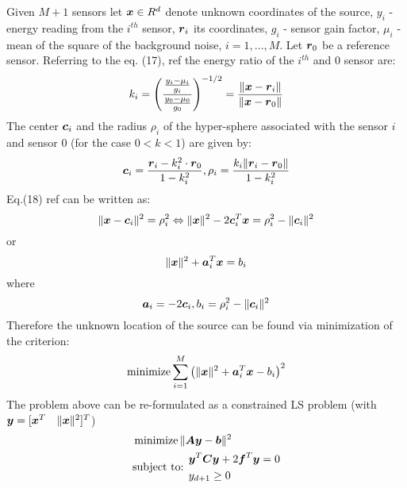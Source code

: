 \documentclass{amsart}
\theoremstyle{definition}
\theoremstyle{remark}
\numberwithin{equation}{section}
\newcommand{\Ba}{\mbox{\boldmath$a$}}
\newcommand{\Bb}{\mbox{\boldmath$b$}}
\newcommand{\Bc}{\mbox{\boldmath$c$}}
\newcommand{\Bf}{\mbox{\boldmath$f$}}
\newcommand{\Br}{\mbox{\boldmath$r$}}
\newcommand{\Bx}{\mbox{\boldmath$x$}}
\newcommand{\By}{\mbox{\boldmath$y$}}
\newcommand{\BA}{\mbox{\boldmath$A$}}
\newcommand{\BC}{\mbox{\boldmath$C$}}
\newcommand {\Min} {\mathop{\mbox{minimize}}}
\begin{document}
\title{}%
%

\begin{abstract}

\end{abstract}
\maketitle
\section{}
Given $M+1$ sensors let $\Bx \in R^d$ denote unknown coordinates of the source, $y_i$ - energy reading from the $i^{th}$ sensor, $\Br_i$ its coordinates, $g_i$ - sensor gain factor, $\mu_i$ - mean of the square of the background noise, $i=1,\ldots,M$. Let $\Br_0$ be a reference sensor. Referring to the eq. (17), ref \cite{1} the energy ratio of the $i^{th}$ and 0 sensor are:
\begin{equation}%
\setcounter{equation}{1}
k_i = \left({{y_{i}-\mu_i \over g_{i}} \over {{y_{0}-\mu_0 \over g_{0}}}}\right)^{-1/2} = {{\|\Bx-\Br_i\|} \over {\|\Bx-\Br_0\|}}
\end{equation}
The center $\Bc_i$ and the radius $\rho_i$ of the hyper-sphere associated with the sensor $i$ and sensor 0 (for the case $0<k<1$) are given by:
\begin{equation}%
\Bc_i = \frac{\Br_i - k_i^2\cdot\Br_0}{1-k_i^2}, \rho_i = \frac{k_i\|\Br_i - \Br_0\|}{1-k_i^2}
\end{equation}
Eq.(18) ref \cite{1} can be written as:
\begin{equation}%
\|\Bx - \Bc_i\|^2 = \rho_i^2 \Leftrightarrow \|\Bx\|^2 - 2\Bc_i^T\Bx = \rho_i^2 - \|\Bc_i\|^2
\end{equation}
or
\begin{equation}%
\|\Bx\|^2 + \Ba_i^T\Bx = b_i
\end{equation}
where
\begin{equation}%
\Ba_i = -2\Bc_i, b_i = \rho_i^2 - \|\Bc_i\|^2
\end{equation}
Therefore the unknown location of the source can be found via minimization of the criterion:
\begin{equation}%
\Min \sum_{i=1}^M \left(\|\Bx\|^2 + \Ba_i^T\Bx - b_i \right)^2
\end{equation}
The problem above can be re-formulated as a constrained LS problem (with $\By = [\Bx^T \quad \|\Bx\|^2]^T$)
\begin{equation}%
\begin{aligned}
&\Min \|\BA\By - \Bb\|^2\\
&\mbox{subject to: } 
\begin{aligned} 
&\By^T\BC\By + 2\Bf^T\By = 0 \\
& y_{d+1} \geq 0
\end{aligned}
\end{aligned}
\end{equation}
\end{document}
